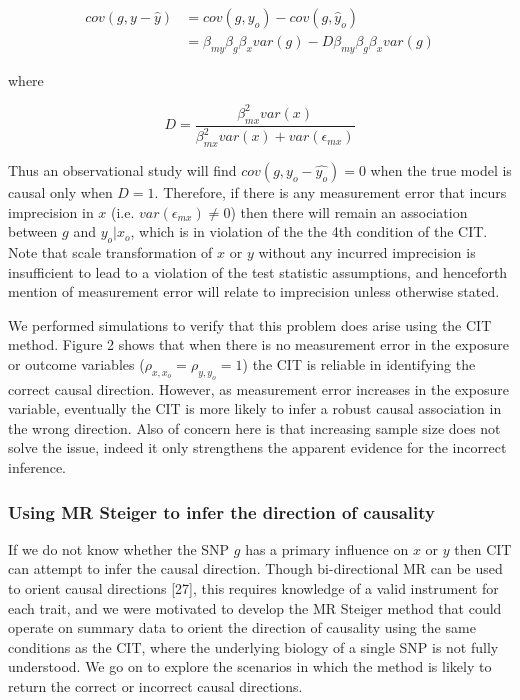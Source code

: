 \documentclass[]{article}
\begin{document}
\[
\begin{aligned}
cov(g, y - \hat{y}) & = cov(g, y_o) - cov(g, \hat{y}_o)  \\
                    & = \beta_{my} \beta_g \beta_x var(g) - D \beta_{my} \beta_g \beta_x var(g)
\end{aligned}
\]

where

\[
D = \frac{\beta^2_{mx} var(x)} {\beta^2_{mx} var(x) + var(\epsilon_{mx})}
\]

Thus an observational study will find \(cov(g, y_o - \hat{y_o}) = 0\)
when the true model is causal only when \(D = 1\). Therefore, if there
is any measurement error that incurs imprecision in \(x\) (i.e.
\(var(\epsilon_{mx}) \neq 0\)) then there will remain an association
between \(g\) and \(y_o | x_o\), which is in violation of the the 4th
condition of the CIT. Note that scale transformation of \(x\) or \(y\)
without any incurred imprecision is insufficient to lead to a violation
of the test statistic assumptions, and henceforth mention of measurement
error will relate to imprecision unless otherwise stated.

We performed simulations to verify that this problem does arise using
the CIT method. Figure 2 shows that when there is no measurement error
in the exposure or outcome variables (\(\rho_{x, x_o}=\rho_{y, y_o}=1\))
the CIT is reliable in identifying the correct causal direction.
However, as measurement error increases in the exposure variable,
eventually the CIT is more likely to infer a robust causal association
in the wrong direction. Also of concern here is that increasing sample
size does not solve the issue, indeed it only strengthens the apparent
evidence for the incorrect inference.

\hypertarget{using-mr-steiger-to-infer-the-direction-of-causality}{%
\subsubsection{Using MR Steiger to infer the direction of
causality}\label{using-mr-steiger-to-infer-the-direction-of-causality}}

If we do not know whether the SNP \(g\) has a primary influence on \(x\)
or \(y\) then CIT can attempt to infer the causal direction. Though
bi-directional MR can be used to orient causal directions {[}27{]}, this
requires knowledge of a valid instrument for each trait, and we were
motivated to develop the MR Steiger method that could operate on summary
data to orient the direction of causality using the same conditions as
the CIT, where the underlying biology of a single SNP is not fully
understood. We go on to explore the scenarios in which the method is
likely to return the correct or incorrect causal directions.
\end{document}
